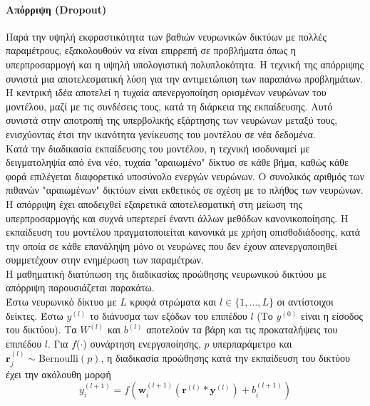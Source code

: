 \documentclass[12pt]{article}
\numberwithin{equation}{section}
\begin{document}
\paragraph{Απόρριψη (Dropout) \\ [0.5 cm]}

Παρά την υψηλή εκφραστικότητα των βαθιών νευρωνικών δικτύων με πολλές παραμέτρους, εξακολουθούν να είναι επιρρεπή σε προβλήματα όπως η υπερπροσαρμογή και η υψηλή υπολογιστική πολυπλοκότητα. Η τεχνική της απόρριψης συνιστά μια αποτελεσματική λύση για την αντιμετώπιση των παραπάνω προβλημάτων. Η κεντρική ιδέα αποτελεί η τυχαία απενεργοποίηση ορισμένων νευρώνων του μοντέλου, μαζί με τις συνδέσεις τους, κατά τη διάρκεια της εκπαίδευσης. Αυτό συνιστά στην αποτροπή της υπερβολικής εξάρτησης των νευρώνων μεταξύ τους, ενισχύοντας έτσι την ικανότητα γενίκευσης του μοντέλου σε νέα δεδομένα. \\

 Κατά την διαδικασία εκπαίδευσης του μοντέλου, η τεχνική ισοδυναμεί με δειγματοληψία από ένα νέο, τυχαία "αραιωμένο" δίκτυο σε κάθε βήμα, καθώς κάθε φορά επιλέγεται διαφορετικό υποσύνολο ενεργών νευρώνων. Ο συνολικός αριθμός των πιθανών "αραιωμένων" δικτύων είναι εκθετικός σε σχέση με το πλήθος των νευρώνων. Η απόρριψη έχει αποδειχθεί εξαιρετικά αποτελεσματική στη μείωση της υπερπροσαρμογής και συχνά υπερτερεί έναντι άλλων μεθόδων κανονικοποίησης. Η εκπαίδευση του μοντέλου πραγματοποιείται κανονικά με χρήση οπισθοδιάδοσης, κατά την οποία σε κάθε επανάληψη μόνο οι νευρώνες που δεν έχουν απενεργοποιηθεί συμμετέχουν στην ενημέρωση των παραμέτρων. \\

\noindent Η μαθηματική διατύπωση της διαδικασίας προώθησης νευρωνικού δικτύου με απόρριψη παρουσιάζεται παρακάτω. \\

\noindent Έστω νευρωνικό δίκτυο με \(L\) κρυφά στρώματα και \(l \in \{1, \ldots, L\}
\) οι αντίστοιχοι δείκτες. Έστω  \( y^{(l)} \) το διάνυσμα των εξόδων του επιπέδου \( l \) (Το \( y^{(0)}\) είναι η είσοδος του δικτύου). Τα \( W^{(l)} \) και \( b^{(l)} \) αποτελούν τα βάρη και τις προκαταλήψεις του επιπέδου \( l \). Για \(f\)(\(\cdot\)) συνάρτηση ενεργοποίησης, \(p\) υπερπαράμετρο και \(\mathbf{r}^{(l)}_j \sim \text{Bernoulli}(p)\), η διαδικασία προώθησης κατά την εκπαίδευση του δικτύου έχει την ακόλουθη μορφή \\

\begin{equation}
y^{(l+1)}_i = f\left(\mathbf{w}^{(l+1)}_i \left(\mathbf{r}^{(l)} \ast \mathbf{y}^{(l)}\right) + b^{(l+1)}_i\right)
\end{equation}\\
\end{document}
